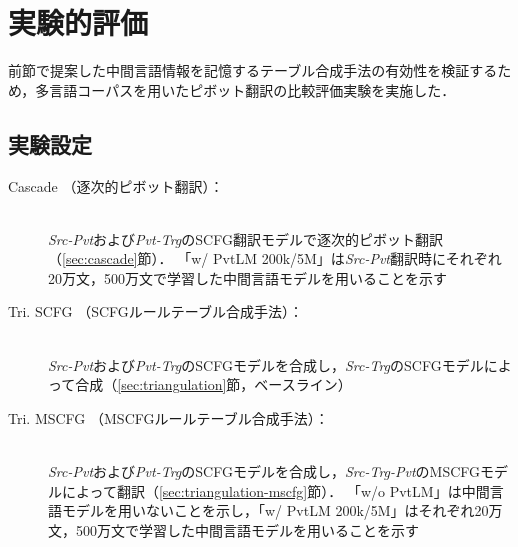 \documentclass[japanese]{jnlp_1.4}
\newcommand{\asis}[1]{}
\begin{document}
\section{実験的評価}

前節で提案した中間言語情報を記憶するテーブル合成手法の有効性を検証するため，多言語コーパスを用いたピボット翻訳の比較評価実験を実施した．


\subsection{実験設定}

\asis{
用いたデータやツールは，\ref{sec:experiment-scfg}節の実験と大部分が共通しているため，差分を明らかにしつつ説明を行う．
本実験では，\ref{sec:experiment-scfg}節の実験で得られた同じ対訳データを用いて各翻訳モデルの学習に用いた．
すなわち，国連多言語コーパスを用いて，英語(En)を中間言語とするアラビア語 (Ar)，スペイン語(Es)，フランス語(Fr)，ロシア語 (Ru)，中国語 (Zh)の5言語の組み合わせでピボット翻訳の翻訳精度を比較し，それぞれの言語対について \textit{Src-Pvt} 翻訳モデルの学習用 (train1) に10万文，\textit{Pvt-Trg} 翻訳モデルの学習用 (train2) に10万文，評価 (test) とパラメータ調整用 (dev) にそれぞれ1,500文ずつを用いた．
目的言語モデルの学習にも，\ref{sec:experiment-scfg}節と同様に train1+train2 の目的言語文20万文を用いている．
また，多くの場合，英語においては大規模な単言語資源が取得可能であるため，最大500万文までのデータを用いて段階的に学習を行った複数の中間言語モデルを用意した．
SCFGおよびMSCFGを用いるデコーダとして Travatar \cite{neubig13travatar} を用い，付属の Hiero ルール抽出プログラムを用いて SCFG 翻訳モデルの学習を行った．
翻訳結果の比較には，自動評価尺度 BLEU \cite{papineni02} を用い，各翻訳モデルは MERT \cite{och03mert}により，開発用データに対して BLEU スコアが最大となるようにパラメータ調整を行った．
提案手法のテーブル合成手法によって得られた MSCFG ルールテーブルは，$L = 20$ の$T_1$-フィルタリング手法によって枝刈りを行った．
本実験では先ず，以下の6つの翻訳手法を比較評価する．
}

\begin{description}
\item[Cascade （逐次的ピボット翻訳）：]\mbox{}\\
\textit{Src-Pvt}および\textit{Pvt-Trg}のSCFG翻訳モデルで逐次的ピボット翻訳（\ref{sec:cascade}節）．
「w/ PvtLM 200k/5M」は\textit{Src-Pvt}翻訳時にそれぞれ20万文，500万文で学習した中間言語モデルを用いることを示す
\item[Tri. SCFG （SCFGルールテーブル合成手法）：]\mbox{}\\
\textit{Src-Pvt}および\textit{Pvt-Trg}のSCFGモデルを合成し，\textit{Src-Trg}のSCFGモデルによって合成（\ref{sec:triangulation}節，ベースライン）
\item[Tri. MSCFG （MSCFGルールテーブル合成手法）：]\mbox{}\\
\textit{Src-Pvt}および\textit{Pvt-Trg}のSCFGモデルを合成し，\textit{Src-Trg-Pvt}のMSCFGモデルによって翻訳（\ref{sec:triangulation-mscfg}節）．
「w/o PvtLM」は中間言語モデルを用いないことを示し，「w/ PvtLM 200k/5M」はそれぞれ20万文，500万文で学習した中間言語モデルを用いることを示す
\end{description}
\end{document}
